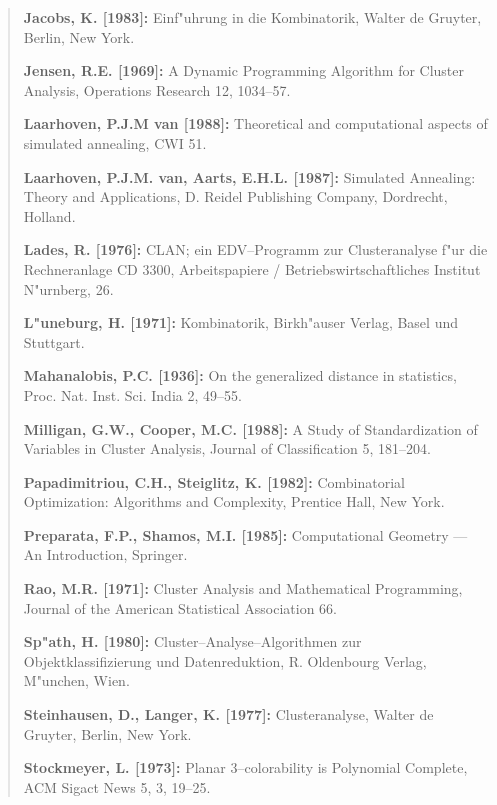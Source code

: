 \begin{sloppy}
\begin{verse}
{\bf Jacobs, K. [1983]:} Einf"uhrung in die Kombinatorik, Walter de
	Gruyter, Berlin, New York.

{\bf Jensen, R.E. [1969]:} A Dynamic Programming Algorithm for Cluster
	Analysis, Operations Research 12, 1034--57.

{\bf Laarhoven, P.J.M van [1988]:} Theoretical and computational
	aspects of simulated annealing, CWI 51.

{\bf Laarhoven, P.J.M. van, Aarts, E.H.L. [1987]:} Simu\-lated Annea\-ling:
	Theo\-ry and Ap\-pli\-ca\-tions, D. Reidel Publishing Company, Dordrecht,
	Holland.

{\bf Lades, R. [1976]:} CLAN; ein EDV--Programm zur Clusteranalyse
	f"ur die Rechneranlage CD 3300, Arbeitspapiere /
	Betriebswirtschaftliches Institut N"urnberg, 26.

{\bf L"uneburg, H. [1971]:} Kombinatorik, Birkh"auser Verlag, Basel
	und Stuttgart.

{\bf Mahanalobis, P.C. [1936]:} On the generalized distance in statistics,
	Proc. Nat. Inst. Sci. India 2, 49--55.

{\bf Milligan, G.W., Cooper, M.C. [1988]:} A Study of Standardization of
	Variables in Cluster Analysis, Journal of Classification 5, 181--204.

{\bf Papadimitriou, C.H., Steiglitz, K. [1982]:} Combinatorial 
	Optimization: Algorithms and Complexity, Prentice Hall, New York.

{\bf Preparata, F.P., Shamos, M.I. [1985]:} Computational
	Geometry --- An Introduction, Springer.

{\bf Rao, M.R. [1971]:} Cluster Analysis and Mathematical Programming,
	Journal of the American Statistical Association 66.

{\bf Sp"ath, H. [1980]:} Cluster--Analyse--Algorithmen zur
	Objektklassifizierung und Datenreduktion, R. Oldenbourg Verlag,
	M"unchen, Wien.

{\bf Steinhausen, D., Langer, K. [1977]:} Clusteranalyse, Walter de
	Gruyter, Berlin, New York.

{\bf Stockmeyer, L. [1973]:} Planar 3--colorability is Polynomial
	Complete, ACM Sigact News 5, 3, 19--25.

\end{verse}
\end{sloppy}
